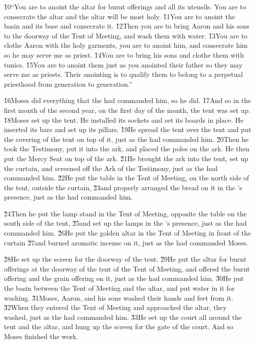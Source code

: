 \v{10}``You are to anoint the altar for burnt offerings and all its utensils. You are to consecrate the altar and the altar will be most holy. \v{11}You are to anoint the basin and its base and consecrate it. \v{12}Then you are to bring Aaron and his sons to the doorway of the Tent of Meeting, and wash them with water. \v{13}You are to clothe Aaron with the holy garments, you are to anoint him, and consecrate him so he may serve me as priest. \v{14}You are to bring his sons and clothe them with tunics. \v{15}You are to anoint them just as you anointed their father so they may serve me as priests. Their anointing is to qualify them to belong to a perpetual priesthood from generation to generation.''

\v{16}Moses did everything that the  had commanded him, so he did. \v{17}And so in the first month of the second year, on the first day of the month, the tent was set up. \v{18}Moses set up the tent. He installed its sockets and set its boards in place. He inserted its bars and set up its pillars. \v{19}He spread the tent over the tent and put the covering of the tent on top of it, just as the  had commanded him. \v{20}Then he took the Testimony, put it into the ark, and placed the poles on the ark. He then put the Mercy Seat on top of the ark. \v{21}He brought the ark into the tent, set up the curtain, and screened off the Ark of the Testimony, just as the  had commanded him. \v{22}He put the table in the Tent of Meeting, on the north side of the tent, outside the curtain, \v{23}and properly arranged the bread on it in the 's presence, just as the  had commanded him.

\v{24}Then he put the lamp stand in the Tent of Meeting, opposite the table on the south side of the tent, \v{25}and set up the lamps in the 's presence, just as the  had commanded him. \v{26}He put the golden altar in the Tent of Meeting in front of the curtain \v{27}and burned aromatic incense on it, just as the  had commanded Moses.

\v{28}He set up the screen for the doorway of the tent. \v{29}He put the altar for burnt offerings at the doorway of the tent of the Tent of Meeting, and offered the burnt offering and the grain offering on it, just as the  had commanded him. \v{30}He put the basin between the Tent of Meeting and the altar, and put water in it for washing. \v{31}Moses, Aaron, and his sons washed their hands and feet from it. \v{32}When they entered the Tent of Meeting and approached the altar, they washed, just as the  had commanded him. \v{33}He set up the court all around the tent and the altar, and hung up the screen for the gate of the court. And so Moses finished the work.

